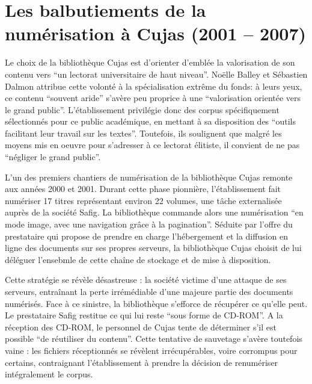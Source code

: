\section[Numérisation à Cujas]{Les balbutiements de la numérisation à Cujas (2001 – 2007)}

Le choix de la bibliothèque Cujas est d'orienter d'emblée la valorisation de son contenu vers \enquote{un lectorat universitaire de haut niveau}. Noëlle Balley et Sébastien Dalmon attribue cette volonté à la spécialisation extrême du fonds: à leurs yeux, ce contenu \enquote{souvent aride} s'avère peu proprice à une \enquote{valorisation orientée vers le grand public}. L'établissement privilégie donc des corpus spécifiquement sélectionnés pour ce public académique, en mettant à sa disposition des \enquote{outils facilitant leur travail sur les textes}. Toutefois, ils soulignent que malgré les moyens mis en oeuvre pour s'adresser à ce lectorat élitiste, il convient de ne pas \enquote{négliger le grand public}.

L'un des premiers chantiers de numérisation de la bibliothèque Cujas remonte aux années 2000 et 2001. Durant cette phase pionnière, l'établissement fait numériser 17 titres représentant environ 22 volumes, une tâche externalisée auprès de la société Safig. La bibliothèque commande alors une numérisation \enquote{en mode image, avec une navigation grâce à la pagination}. Séduite par l'offre du prestataire qui propose de prendre en charge l'hébergement et la diffusion en ligne des documents sur ses propres serveurs, la bibliothèque Cujas choisit de lui déléguer l'ensebmle de cette chaîne de stockage et de mise à disposition. 

Cette stratégie se révèle désastreuse : la société victime d'une attaque de ses serveurs, entraînant la perte irrémédiable d'une majeure partie des documents numérisés. Face à ce sinistre, la bibliothèque s'efforce de récupérer ce qu'elle peut. Le prestataire Safig restitue ce qui lui reste \enquote{sous forme de CD-ROM}. A la réception des CD-ROM, le personnel de Cujas tente de déterminer s'il est possible \enquote{de réutiliser du contenu}. Cette tentative de sauvetage s'avère toutefois vaine : les fichiers réceptionnés se révèlent irrécupérables, voire corrompus pour certains, contraignant l'établissement à prendre la décision de renumériser intégralement le corpus.

